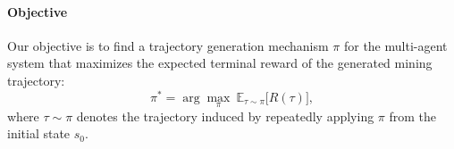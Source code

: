 \paragraph{Objective} Our objective is to find a trajectory generation mechanism $\pi$ for the multi-agent system that maximizes the expected terminal reward of the generated mining trajectory: 
\begin{equation}
\pi^{*}=\arg\max_{\pi}\ \mathbb{E}_{\tau\sim \pi}\bigl[R(\tau)\bigr],
\label{eq:objective_policy}
\end{equation}
where $\tau\sim\pi$ denotes the trajectory induced by repeatedly applying $\pi$ from the initial state $s_0$.
